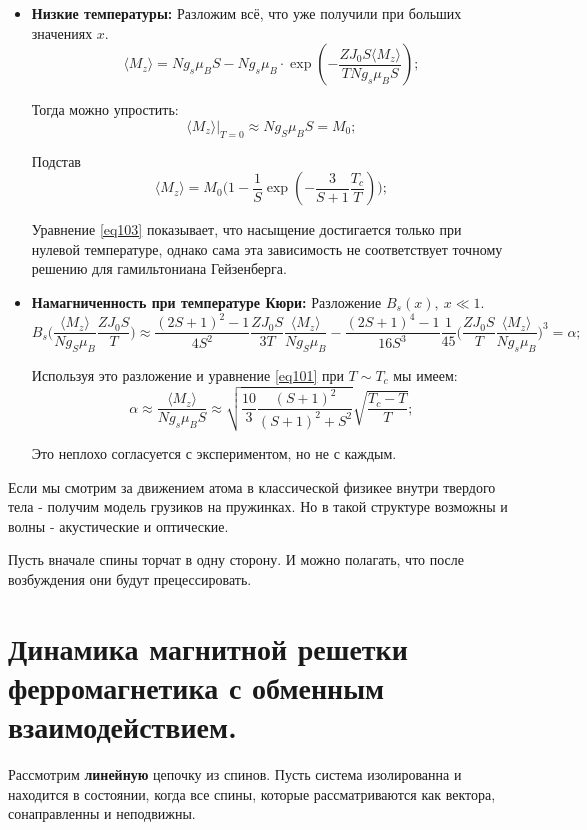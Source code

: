 \documentclass[a4paper, 14pt, russian]{article}
\newcommand{\be}{\begin{equation}}
\newcommand{\ee}{\end{equation}}
\begin{document}
\begin{itemize}
		\item \textbf{Низкие температуры:} Разложим всё, что уже получили 
			при больших значениях $x$.
			\be
				\langle M_z \rangle = N g_s \mu_B S - N g_s \mu_B \cdot 
					\exp(-\frac{ZJ_0S\langle M_z \rangle}{T N g_s \mu_B S});
			\ee

			Тогда можно упростить:
			\be
				\langle M_z \rangle \vert_{T=0}  \approx N g_S \mu_B S = M_0;
			\ee

			Подстав
			\be
				\label{eq103}
				\langle M_z \rangle = M_0 \big(1 - \frac{1}{S} \exp( -\frac{3}{S+1} \frac{T_c}{T})\big);
			\ee

			Уравнение \ref{eq103} показывает, что насыщение достигается только при нулевой 
			температуре, однако сама эта зависимость не соответствует точному решению для 
			гамильтониана Гейзенберга.
		\item \textbf{Намагниченность при температуре Кюри:} Разложение $B_s(x),~x \ll 1$.
			\be
				B_s\big(\frac{\langle M_z \rangle}{Ng_S \mu_B} \frac{ZJ_0 S}{T}\big) \approx
					\frac{(2S+1)^2 - 1}{4S^2} \frac{ZJ_0 S}{3T} \frac{\langle M_z\rangle}{Ng_S \mu_B}
					- \frac{(2S+1)^4 - 1}{16 S^3} \frac{1}{45} 
					\big(\frac{ZJ_0 S}{T}\frac{\langle M_z \rangle}{N g_s \mu_B}\big)^3 = \alpha;
			\ee

			Используя это разложение и уравнение \ref{eq101} при $T \sim T_c$ мы имеем:
			\be
				\label{eq104}
				\alpha \approx \frac{\langle M_z \rangle}{N g_s \mu_B S} 
					\approx \sqrt{\frac{10}{3} \frac{(S+1)^2}{(S+1)^2 + S^2}} \sqrt{\frac{T_c - T}{T}};
			\ee
			
			Это неплохо согласуется с экспериментом, но не с каждым.
	\end{itemize}

	Если мы смотрим за движением атома в классической физикее
	внутри твердого тела - получим модель грузиков на пружинках.
	Но в такой структуре возможны и волны - акустические и оптические.

	Пусть вначале спины торчат в одну сторону. И можно полагать, что 
	после возбуждения они будут прецессировать.

	\section{Динамика магнитной решетки ферромагнетика с обменным взаимодействием.}

	Рассмотрим \textbf{линейную} цепочку из спинов. Пусть система изолированна и находится
	в состоянии, когда все спины, которые рассматриваются как вектора, сонаправленны и 
	неподвижны.
\end{document}
